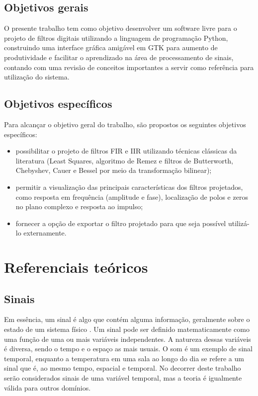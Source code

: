 \documentclass[12pt,a4paper]{report}
\begin{document}
\section{Objetivos gerais}
  O presente trabalho tem como objetivo desenvolver um software livre para o projeto de filtros digitais
  utilizando a linguagem de programação Python, construindo uma interface gráfica amigável em GTK para aumento
  de produtividade e facilitar o aprendizado na área de processamento de sinais, contando com uma revisão de
  conceitos importantes a servir como referência para utilização do sistema.

\section{Objetivos específicos}
  Para alcançar o objetivo geral do trabalho, são propostos os seguintes objetivos específicos:
  \begin{itemize}
    \item possibilitar o projeto de filtros FIR e IIR utilizando técnicas clássicas da literatura (Least Squares,
      algoritmo de Remez e filtros de Butterworth, Chebyshev, Cauer e Bessel por meio da transformação bilinear);
    \item permitir a visualização das principais características dos filtros projetados, como resposta em
      frequência (amplitude e fase), localização de polos e zeros no plano complexo e resposta ao impulso;
    \item fornecer a opção de exportar o filtro projetado para que seja possível utilizá-lo externamente.
  \end{itemize}

\chapter{Referenciais teóricos}
\section{Sinais}
  Em essência, um sinal é algo que contém alguma informação, geralmente sobre o estado de um sistema físico
  \cite{oppenheim}. Um sinal pode ser definido matematicamente como uma função de uma ou mais variáveis
  independentes. A natureza dessas variáveis é diversa, sendo o tempo e o espaço as mais usuais. O som é um
  exemplo de sinal temporal, enquanto a temperatura em uma sala ao longo do dia se refere a um sinal que é,
  ao mesmo tempo, espacial e temporal. No decorrer deste trabalho serão considerados sinais de uma variável
  temporal, mas a teoria é igualmente válida para outros domínios.
\end{document}
